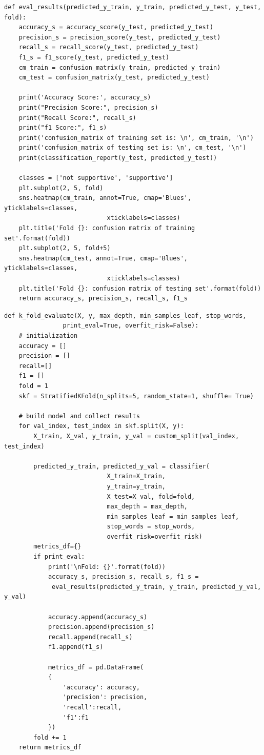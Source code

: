 \documentclass{article} %
\begin{document}
\lstset{language=Python}
\lstset{frame=lines}
\lstset{basicstyle=\footnotesize}
\begin{lstlisting}
def eval_results(predicted_y_train, y_train, predicted_y_test, y_test, fold):
	accuracy_s = accuracy_score(y_test, predicted_y_test)
	precision_s = precision_score(y_test, predicted_y_test)
	recall_s = recall_score(y_test, predicted_y_test)
	f1_s = f1_score(y_test, predicted_y_test)
	cm_train = confusion_matrix(y_train, predicted_y_train)
	cm_test = confusion_matrix(y_test, predicted_y_test)  
	
	print('Accuracy Score:', accuracy_s)
	print("Precision Score:", precision_s)
	print("Recall Score:", recall_s)
	print("f1 Score:", f1_s)
	print('confusion_matrix of training set is: \n', cm_train, '\n')
	print('confusion_matrix of testing set is: \n', cm_test, '\n')
	print(classification_report(y_test, predicted_y_test))
	
	classes = ['not supportive', 'supportive']
	plt.subplot(2, 5, fold)
	sns.heatmap(cm_train, annot=True, cmap='Blues', yticklabels=classes, 
							xticklabels=classes)
	plt.title('Fold {}: confusion matrix of training set'.format(fold))
	plt.subplot(2, 5, fold+5)
	sns.heatmap(cm_test, annot=True, cmap='Blues', yticklabels=classes, 
						 	xticklabels=classes)
	plt.title('Fold {}: confusion matrix of testing set'.format(fold))
	return accuracy_s, precision_s, recall_s, f1_s
\end{lstlisting}


\lstset{language=Python}
\lstset{frame=lines}
\lstset{basicstyle=\footnotesize}
\begin{lstlisting}
def k_fold_evaluate(X, y, max_depth, min_samples_leaf, stop_words,
				print_eval=True, overfit_risk=False):
	# initialization
	accuracy = []
	precision = []
	recall=[]
	f1 = []
	fold = 1
	skf = StratifiedKFold(n_splits=5, random_state=1, shuffle= True)

	# build model and collect results
	for val_index, test_index in skf.split(X, y):
		X_train, X_val, y_train, y_val = custom_split(val_index, test_index)

		predicted_y_train, predicted_y_val = classifier(
							X_train=X_train,
							y_train=y_train, 
							X_test=X_val, fold=fold,
							max_depth = max_depth,
							min_samples_leaf = min_samples_leaf,
							stop_words = stop_words,
							overfit_risk=overfit_risk)
		metrics_df={}
		if print_eval:
			print('\nFold: {}'.format(fold))
			accuracy_s, precision_s, recall_s, f1_s =
			 eval_results(predicted_y_train, y_train, predicted_y_val, y_val)
			
			accuracy.append(accuracy_s)
			precision.append(precision_s)
			recall.append(recall_s)
			f1.append(f1_s)
			
			metrics_df = pd.DataFrame(
			{
				'accuracy': accuracy,
				'precision': precision,
				'recall':recall,
				'f1':f1
			})
		fold += 1
	return metrics_df
\end{lstlisting}
\end{document}
